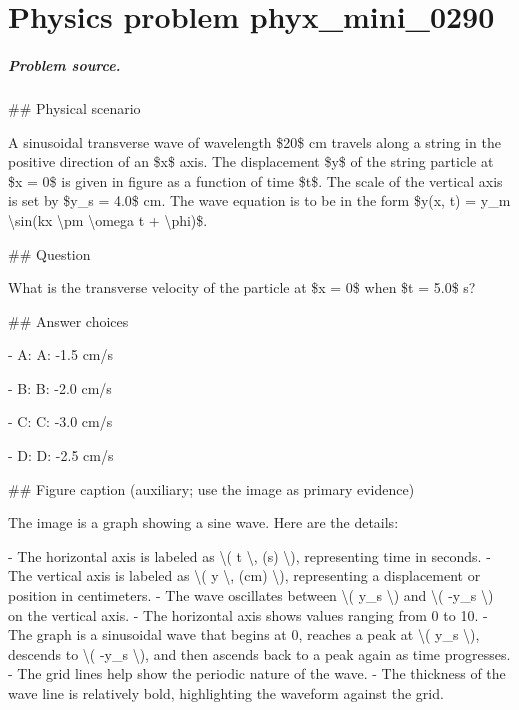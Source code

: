 
\chapter{Physics problem phyx\_mini\_0290}
\label{ch:PhyXMiniProblems_problem_phyx_mini_0290}

\paragraph{Problem source.}
\#\# Physical scenario

A sinusoidal transverse wave of wavelength \$20\$ cm travels along a string in the positive direction of an \$x\$ axis. The displacement \$y\$ of the string particle at \$x = 0\$ is given in figure as a function of time \$t\$. The scale of the vertical axis is set by \$y\_s = 4.0\$ cm. The wave equation is to be in the form \$y(x, t) = y\_m \textbackslash{}sin(kx \textbackslash{}pm \textbackslash{}omega t + \textbackslash{}phi)\$.

\#\# Question

What is the transverse velocity of the particle at \$x = 0\$ when \$t = 5.0\$ s?

\#\# Answer choices

- A: A: -1.5 cm/s

- B: B: -2.0 cm/s

- C: C: -3.0 cm/s

- D: D: -2.5 cm/s

\#\# Figure caption (auxiliary; use the image as primary evidence)

The image is a graph showing a sine wave. Here are the details:

- The horizontal axis is labeled as \textbackslash{}( t \textbackslash{}, (s) \textbackslash{}), representing time in seconds.
- The vertical axis is labeled as \textbackslash{}( y \textbackslash{}, (cm) \textbackslash{}), representing a displacement or position in centimeters.
- The wave oscillates between \textbackslash{}( y\_s \textbackslash{}) and \textbackslash{}( -y\_s \textbackslash{}) on the vertical axis.
- The horizontal axis shows values ranging from 0 to 10.
- The graph is a sinusoidal wave that begins at 0, reaches a peak at \textbackslash{}( y\_s \textbackslash{}), descends to \textbackslash{}( -y\_s \textbackslash{}), and then ascends back to a peak again as time progresses.
- The grid lines help show the periodic nature of the wave.
- The thickness of the wave line is relatively bold, highlighting the waveform against the grid.

